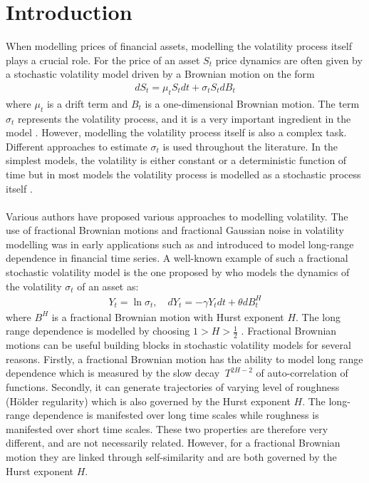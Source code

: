 \documentclass{article}
\begin{document}
\tableofcontents
\newpage
{}
\section{Introduction}
When modelling prices of financial assets, modelling the volatility process itself plays a crucial role. For the price of an asset $S_t$ price dynamics are often given by a stochastic volatility model driven by a Brownian motion on the form
\begin{align}
dS_t = \mu_tS_t dt+\sigma_tS_t dB_t \label{eq:price_gen}
\end{align}
where $\mu_t$ is a drift term and $B_t$ is a one-dimensional Brownian motion. The term $\sigma_t$ represents the volatility process, and it is a very important ingredient in the model . However, modelling the volatility process itself is also a complex task. Different approaches to estimate $\sigma_t$ is used throughout the literature. In the simplest models, the volatility is either constant or a deterministic function of time but in most models the volatility process is modelled as a stochastic process itself \cite{gatheral}. \\\\
Various authors have proposed various approaches to modelling volatility. The use of fractional Brownian motions and fractional Gaussian noise in volatility modelling was in early applications such as \cite{Bollerslev} and \cite{comte} introduced to model long-range dependence in financial time series. A well-known example of such a fractional stochastic volatility model is the one proposed by \cite{comte} who models the dynamics of the volatility $\sigma_t$ of an asset as:
\begin{align*}
Y_t = \ln\sigma_t, \quad dY_t = -\gamma Y_t dt+\theta dB^H_t
\end{align*}
where $B^H$ is a fractional Brownian motion with Hurst exponent $H$. The long range dependence is modelled by choosing $1>H>\frac{1}{2}$ \cite{comte}. Fractional Brownian motions can be useful building blocks in stochastic volatility models for several reasons. Firstly, a fractional Brownian motion has the ability to model long range dependence which is measured by the slow decay $~T^{2H-2}$ of auto-correlation of functions. Secondly, it can generate trajectories of varying level of roughness (Hölder regularity) which is also governed by the Hurst exponent $H$. The long-range dependence is manifested over long time scales while roughness is manifested over short time scales. These two properties are therefore very different, and are not necessarily related. However, for a fractional Brownian motion they are linked through self-similarity and are both governed by the Hurst exponent $H$.\\\\
\end{document}
